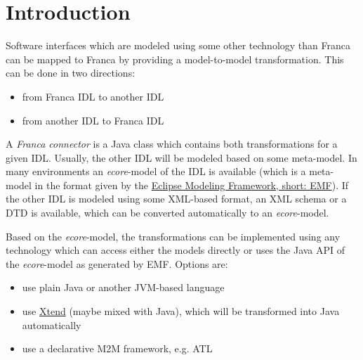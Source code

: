 \documentclass[a4paper,10pt]{scrreprt}
\newlength{\XdocItemIndent}
\begin{document}
\section{Introduction}
\label{BuildingTransformations_Introduction}
Software interfaces which are modeled using some other technology than Franca
can be mapped to Franca by providing a model-to-model transformation. This can be done 
in two directions:

\setlength{\XdocItemIndent}{\textwidth}
\begin{itemize}
\addtolength{\XdocItemIndent}{-2.5em}
\item \begin{minipage}[t]{\XdocItemIndent}
from Franca IDL to another IDL

\end{minipage}
\item \begin{minipage}[t]{\XdocItemIndent}
from another IDL to Franca IDL

\end{minipage}
\end{itemize}
\addtolength{\XdocItemIndent}{2.5em}

A \textit{Franca connector} is a Java class which contains both transformations for a
given IDL. Usually, the other IDL will be modeled based on some meta-model. 
In many environments an \textit{ecore}-model of the IDL is available
(which is a meta-model in the format given by the
\href{http://www.eclipse.org/modeling/emf/}{Eclipse Modeling Framework, short: EMF}).
If the other IDL is modeled using some XML-based format, an XML schema or a 
DTD is available, which can be converted automatically to an \textit{ecore}-model.

Based on the \textit{ecore}-model, the transformations can be implemented using
any technology which can access either the models directly or uses the
Java API of the \textit{ecore}-model as generated by EMF. Options are:

\setlength{\XdocItemIndent}{\textwidth}
\begin{itemize}
\addtolength{\XdocItemIndent}{-2.5em}
\item \begin{minipage}[t]{\XdocItemIndent}
use plain Java or another JVM-based language

\end{minipage}
\item \begin{minipage}[t]{\XdocItemIndent}
use \href{http://xtend-lang.org}{Xtend} (maybe mixed with Java),
	     which will be transformed into Java automatically

\end{minipage}
\item \begin{minipage}[t]{\XdocItemIndent}
use a declarative M2M framework, e.g. ATL

\end{minipage}
\end{itemize}
\addtolength{\XdocItemIndent}{2.5em}
\end{document}
